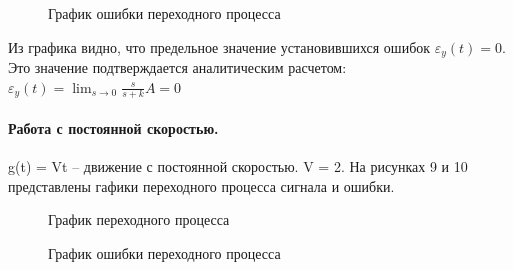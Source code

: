 \documentclass[a4paper, 11pt]{article}
\begin{document}
\begin{figure}[h!]
    \caption{График ошибки переходного процесса}
    \label{tree}
\end{figure}

Из графика видно, что предельное значение установившихся ошибок $\varepsilon_y(t)=0$. Это значение подтверждается аналитическим расчетом: $\varepsilon_y(t)=\lim_{s\to0}\frac{s}{s+k}A=0$\\


\paragraph{Работа с постоянной скоростью.} g(t) = Vt – движение с постоянной скоростью. V = 2. На рисунках 9 и 10 представлены гафики переходного процесса сигнала и ошибки.


\begin{figure}[h!]
    \caption{График переходного процесса}
    \label{two}
\end{figure}

\newpage

\begin{figure}[h!]
    \caption{График ошибки переходного процесса}
    \label{tree}
\end{figure}
\end{document}
